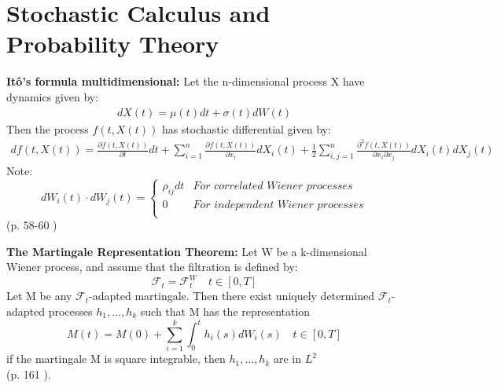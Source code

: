 
\chapter{Stochastic Calculus and Probability Theory} %

\label{AppendixA} %

\begin{theorem}\label{Ito}
\textbf{Itô's formula multidimensional: } Let the n-dimensional process X have dynamics given by:
\begin{align}
dX(t)=\mu(t)dt+\sigma(t)dW(t)
\end{align}
Then the process $f(t,X(t))$ has stochastic differential given by:
\begin{equation}
\begin{split}
df(t,X(t))=\frac{\partial f(t,X(t))}{\partial t}  dt + \sum_{i=1}^{n} \frac{\partial f(t,X(t))}{\partial x_i}  dX_i(t) + \frac{1}{2} \sum_{i,j=1}^{n} \frac{\partial^2 f(t,X(t))}{\partial x_i \partial x_j}  dX_i(t)dX_j(t)  
\end{split}
\end{equation}
Note: \[ dW_i(t) \cdot dW_j(t)= \begin{cases} 
      \rho_{ij}dt & \textit{For correlated Wiener processes} \\
      0 & \textit{For independent Wiener processes} \\
   \end{cases}
\]
\null \hfill (p. 58-60 \parencite{finKont})
\end{theorem}

\begin{theorem}\label{MRT}
\textbf{The Martingale Representation Theorem: } 
Let W be a k-dimensional Wiener process, and assume that the filtration is defined by:
$$\mathcal{F}_t=\mathcal{F}_t^W \quad t\in [0,T]$$
Let M be any $\mathcal{F}_t$-adapted martingale. Then there exist uniquely determined $\mathcal{F}_t$-adapted processes $h_1, \ldots, h_k$ such that M has the representation
$$M(t)=M(0) + \sum_{i=1}^{k} \int_{0}^{t} h_i(s)dW_i(s) \quad t \in [0,T]$$
if the martingale M is square integrable, then $h_1, \ldots, h_k$ are in $L^2$\\
\null \hfill (p. 161 \parencite{finKont}).
\end{theorem}

